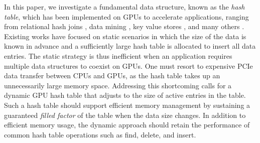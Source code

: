 In this paper, we investigate a fundamental data structure, known as the \emph{hash table}, which has been implemented on GPUs to accelerate applications, ranging from relational hash joins \cite{he2008relational,he2009relational,heimel2013hardware}, data mining \cite{pan2011fast,zhou2010parallel,zhong2014medusa},  key value stores \cite{zhang2015mega,hetherington2015memcachedgpu,breslow2016horton}, and many others \cite{bowers2010parallel,pan2010efficient,garcia2011coherent,niessner2013real,wu2015gpu}. Existing works \cite{alcantara2009real,zhang2015mega,hong2010mapcg,hetherington2015memcachedgpu,breslow2016horton} have focused on static scenarios in which the size of the data is known in advance and  a sufficiently large hash table is allocated to insert all data entries. 
The static strategy is thus inefficient when an application requires multiple data structures to coexist on GPUs. One must resort to expensive PCIe data transfer between CPUs and GPUs, as the hash table takes up an unnecessarily large memory space. 
Addressing this shortcoming calls for a dynamic GPU hash table that adjusts to the size of active entries in the table. 
Such a hash table should support efficient memory management by sustaining a guaranteed \emph{filled factor} of the table when the data size changes. 
In addition to efficient memory usage, the dynamic approach should retain the performance of common hash table operations such as find, delete, and insert.


